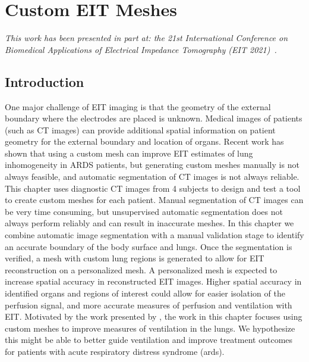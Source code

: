 \chapter{Custom EIT Meshes}
\label{chap:chapter-5}

\emph{This work has been presented in part at: 
 the 21st International Conference on Biomedical 
 Applications of Electrical Impedance Tomography (EIT 2021)~\parencite{stowe_generating_2021}.} 


\section{Introduction}
One major challenge of EIT imaging is that the geometry of the 
external boundary where the electrodes are placed is unknown. 
Medical images of patients (such as CT images) can provide 
additional spatial information 
on patient geometry for the external boundary and location of organs. 
Recent work has shown that using a custom mesh can improve
EIT estimates of lung inhomogeneity \parencite{yang_lung_2021} in 
ARDS patients, but generating custom meshes manually is not always feasible,
and automatic segmentation of CT images is not always reliable. 
This chapter uses diagnostic CT images from 4 subjects to design and test 
a tool to create custom meshes for each patient. 
Manual segmentation of CT images can be very time consuming, 
but unsupervised automatic segmentation does not always perform reliably 
and can result in inaccurate meshes. 
In this chapter we combine automatic image 
segmentation with a manual validation stage 
to identify an accurate boundary of the body surface and lungs. 
Once the segmentation is verified, a mesh with custom lung regions is generated to 
allow for EIT reconstruction on a personalized mesh. 
A personalized mesh is expected to increase spatial accuracy 
in reconstructed EIT images. 
Higher spatial accuracy in 
identified organs and regions of interest could allow for 
easier isolation of the perfusion signal, and more accurate 
measures of perfusion and ventilation with EIT.
Motivated by the work presented by ,
the work in this chapter focuses using custom meshes to improve measures 
of ventilation
in the lungs.  We hypothesize this might be able to  
better guide ventilation and improve treatment outcomes 
for patients with acute respiratory distress syndrome (\acrshort{ards}).

